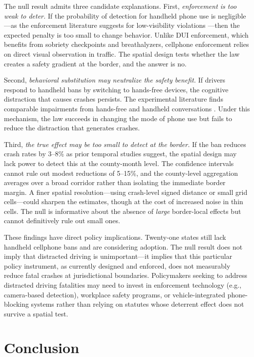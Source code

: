 \documentclass[12pt]{article}
\begin{document}
The null result admits three candidate explanations. First, \textit{enforcement is too weak to deter.} If the probability of detection for handheld phone use is negligible---as the enforcement literature suggests for low-visibility violations \citep{DeAngelo2017}---then the expected penalty is too small to change behavior. Unlike DUI enforcement, which benefits from sobriety checkpoints and breathalyzers, cellphone enforcement relies on direct visual observation in traffic. The spatial design tests whether the law creates a safety gradient at the border, and the answer is no.

Second, \textit{behavioral substitution may neutralize the safety benefit.} If drivers respond to handheld bans by switching to hands-free devices, the cognitive distraction that causes crashes persists. The experimental literature finds comparable impairments from hands-free and handheld conversations \citep{Strayer2006, Caird2008}. Under this mechanism, the law succeeds in changing the mode of phone use but fails to reduce the distraction that generates crashes.

Third, \textit{the true effect may be too small to detect at the border.} If the ban reduces crash rates by 3--8\% as prior temporal studies suggest, the spatial design may lack power to detect this at the county-month level. The confidence intervals cannot rule out modest reductions of 5--15\%, and the county-level aggregation averages over a broad corridor rather than isolating the immediate border margin. A finer spatial resolution---using crash-level signed distance or small grid cells---could sharpen the estimates, though at the cost of increased noise in thin cells. The null is informative about the absence of \textit{large} border-local effects but cannot definitively rule out small ones.

These findings have direct policy implications. Twenty-one states still lack handheld cellphone bans and are considering adoption. The null result does not imply that distracted driving is unimportant---it implies that this particular policy instrument, as currently designed and enforced, does not measurably reduce fatal crashes at jurisdictional boundaries. Policymakers seeking to address distracted driving fatalities may need to invest in enforcement technology (e.g., camera-based detection), workplace safety programs, or vehicle-integrated phone-blocking systems rather than relying on statutes whose deterrent effect does not survive a spatial test.


\section{Conclusion}
\end{document}
